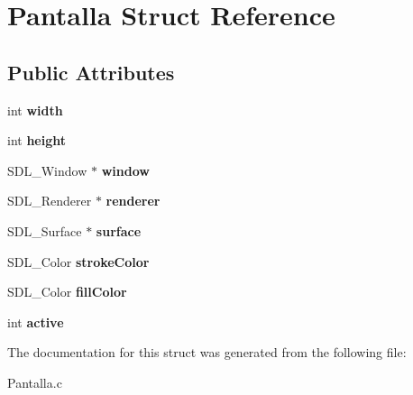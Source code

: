 \hypertarget{struct_pantalla}{}\section{Pantalla Struct Reference}
\label{struct_pantalla}
\subsection*{Public Attributes}
\begin{DoxyCompactItemize}
\item 
\mbox{\label{struct_pantalla_a0e9fa97feaefd883cbd532f737d9554e}} 
int {\bfseries width}
\item 
\mbox{\label{struct_pantalla_ae15fda85fd6288ea074a7a1b300fd58a}} 
int {\bfseries height}
\item 
\mbox{\label{struct_pantalla_a8dec9e2d342435a93855aeb511ccd862}} 
S\+D\+L\+\_\+\+Window $\ast$ {\bfseries window}
\item 
\mbox{\label{struct_pantalla_aef7ea33823f4c47b5375139c124a8029}} 
S\+D\+L\+\_\+\+Renderer $\ast$ {\bfseries renderer}
\item 
\mbox{\label{struct_pantalla_a285cfe423fdb8f711ff813b909e0e52e}} 
S\+D\+L\+\_\+\+Surface $\ast$ {\bfseries surface}
\item 
\mbox{\label{struct_pantalla_abd2fd66b3aba1f8ade0bc7f132b63038}} 
S\+D\+L\+\_\+\+Color {\bfseries stroke\+Color}
\item 
\mbox{\label{struct_pantalla_ab15d952c42d74e338c2ca5ee6ff318c6}} 
S\+D\+L\+\_\+\+Color {\bfseries fill\+Color}
\item 
\mbox{\label{struct_pantalla_ad8de13a81c87bec0924e85e6ab14fac2}} 
int {\bfseries active}
\end{DoxyCompactItemize}


The documentation for this struct was generated from the following file\+:\begin{DoxyCompactItemize}
\item 
Pantalla.\+c\end{DoxyCompactItemize}
